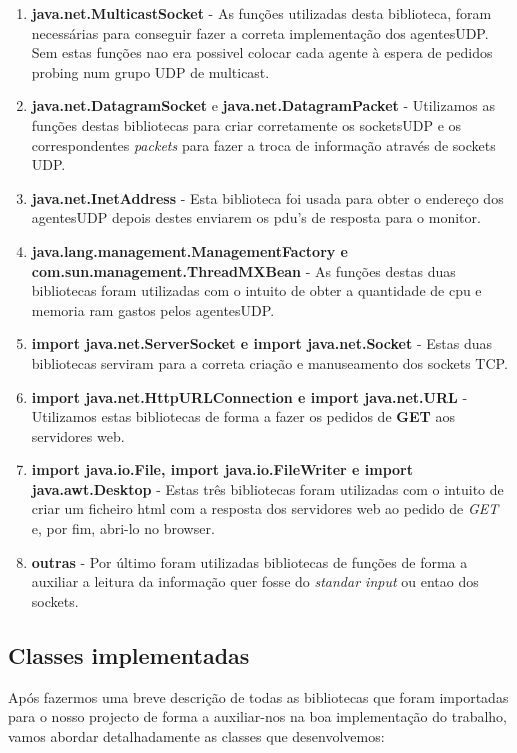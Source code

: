 \documentclass{llncs}
\begin{document}
			\begin{enumerate}

				\item \textbf{java.net.MulticastSocket} - As funções utilizadas desta biblioteca, foram necessárias para conseguir fazer a correta implementação dos agentesUDP. Sem estas funções nao era possivel colocar cada agente à espera de pedidos probing num grupo UDP de multicast.
				\bigskip
				\item \textbf{java.net.DatagramSocket} e \textbf{java.net.DatagramPacket} - Utilizamos as funções destas bibliotecas para criar corretamente os socketsUDP e os correspondentes \textit{packets} para fazer a troca de informação através de sockets UDP.
				\bigskip
				\item \textbf{java.net.InetAddress} - Esta biblioteca foi usada para obter o endereço dos agentesUDP depois destes enviarem os pdu's de resposta para o monitor.
				\bigskip
				\item \textbf{java.lang.management.ManagementFactory e com.sun.management.ThreadMXBean} - As funções destas duas bibliotecas foram utilizadas com o intuito de obter a quantidade de cpu e memoria ram gastos pelos agentesUDP.
				\bigskip
				\item \textbf{import java.net.ServerSocket e import java.net.Socket} - Estas duas bibliotecas serviram para a correta criação e manuseamento dos sockets TCP.
				\bigskip
				\item \textbf{import java.net.HttpURLConnection e import java.net.URL} - Utilizamos estas bibliotecas de forma a fazer os pedidos de \textbf{GET} aos servidores web. 
				\bigskip
				\item \textbf{import java.io.File, import java.io.FileWriter e import java.awt.Desktop} - Estas três bibliotecas foram utilizadas com o intuito de criar um ficheiro html com a resposta dos servidores web ao pedido de \textit{GET} e, por fim, abri-lo no browser.
				\bigskip
				\item \textbf{outras} - Por último foram utilizadas bibliotecas de funções de forma a auxiliar a leitura da informação quer fosse do \textit{standar input} ou entao dos sockets.


			\end{enumerate} 

	\subsection{Classes implementadas}

		Após fazermos uma breve descrição de todas as bibliotecas que foram importadas para o nosso projecto de forma a auxiliar-nos na boa implementação do trabalho, vamos abordar detalhadamente as classes que desenvolvemos:
\end{document}
